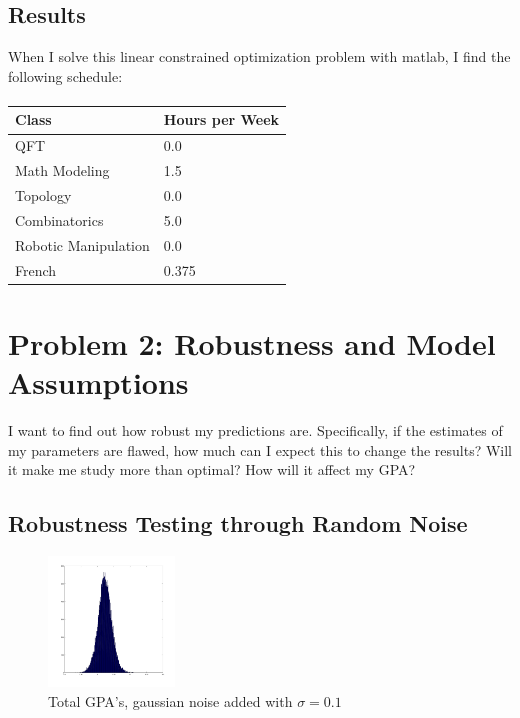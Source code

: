 \documentclass{article}
\begin{document}
\subsection{Results}

When I solve this linear constrained optimization problem with matlab,
	I find the following schedule:

\paragraph{}
\begin{tabular}{|l|l|}
\hline
Class & Hours per Week \\
\hline
QFT & 0.0 \\
\hline
Math Modeling & 1.5 \\
\hline
Topology & 0.0 \\
\hline
Combinatorics & 5.0 \\
\hline 
Robotic Manipulation & 0.0 \\
\hline
French & 0.375 \\
\hline
\end{tabular}


\section{Problem 2: Robustness and Model Assumptions}

I want to find out how robust my predictions are.
Specifically, if the estimates of my parameters are flawed, how much
	can I expect this to change the results?
Will it make me study more than optimal?
How will it affect my GPA?

\subsection{Robustness Testing through Random Noise}

\begin{figure}
\begin{center}
\includegraphics[width=0.3\textwidth]{stdiv-01-hist.png}
\end{center}
\caption{Total GPA's, gaussian noise added with $\sigma = 0.1$}
\end{figure}
\end{document}
